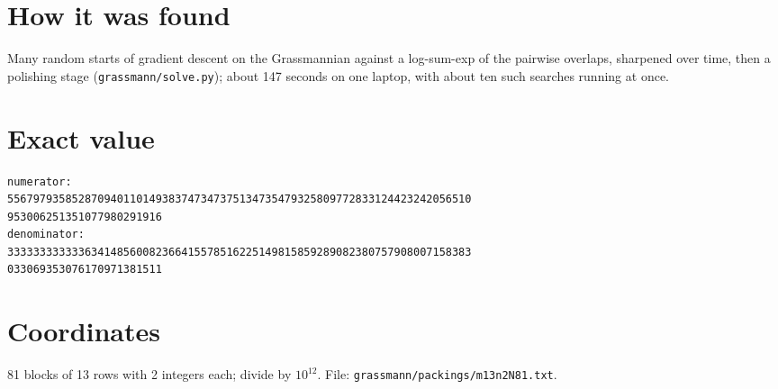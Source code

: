 \documentclass[11pt,a4paper]{article}
\begin{document}
\section{How it was found}
Many random starts of gradient descent on the Grassmannian against a log-sum-exp of the pairwise overlaps, sharpened over time, then a polishing stage (\texttt{grassmann/solve.py}); about 147 seconds on one laptop, with about ten such searches running at once.


\appendix
\section{Exact value}
{\small
\begin{verbatim}
numerator:
556797935852870940110149383747347375134735479325809772833124423242056510
953006251351077980291916
denominator:
333333333333634148560082366415578516225149815859289082380757908007158383
033069353076170971381511
\end{verbatim}}

\section{Coordinates}
81 blocks of 13 rows with 2 integers each; divide by $10^{12}$. File: \texttt{grassmann/packings/m13n2N81.txt}.
{\tiny
\begin{multicols}{4}
\end{multicols}}
\end{document}
